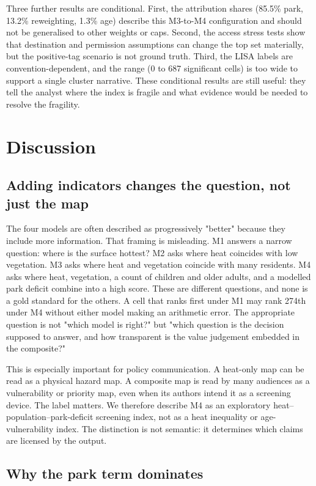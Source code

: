 \documentclass[times,twoside]{_Templates/MultiTargetManuscript}
\begin{document}
Three further results are conditional. First, the attribution shares (85.5\%
park, 13.2\% reweighting, 1.3\% age) describe this M3-to-M4 configuration and
should not be generalised to other weights or caps. Second, the access stress
tests show that destination and permission assumptions can change the top set
materially, but the positive-tag scenario is not ground truth. Third, the LISA
labels are convention-dependent, and the range (0 to 687 significant cells) is
too wide to support a single cluster narrative. These conditional results are
still useful: they tell the analyst where the index is fragile and what evidence
would be needed to resolve the fragility.

\section{Discussion}

\subsection{Adding indicators changes the question, not just the map}

The four models are often described as progressively "better" because they
include more information. That framing is misleading. M1 answers a narrow
question: where is the surface hottest? M2 asks where heat coincides with low
vegetation. M3 asks where heat and vegetation coincide with many residents. M4
asks where heat, vegetation, a count of children and older adults, and a modelled
park deficit combine into a high score. These are different questions, and none
is a gold standard for the others. A cell that ranks first under M1 may rank
274th under M4 without either model making an arithmetic error. The appropriate
question is not "which model is right?" but "which question is the decision
supposed to answer, and how transparent is the value judgement embedded in the
composite?"

This is especially important for policy communication. A heat-only map can be
read as a physical hazard map. A composite map is read by many audiences as a
vulnerability or priority map, even when its authors intend it as a screening
device. The label matters. We therefore describe M4 as an exploratory
heat--population--park-deficit screening index, not as a heat inequality or
age-vulnerability index. The distinction is not semantic: it determines which
claims are licensed by the output.

\subsection{Why the park term dominates}
\end{document}

